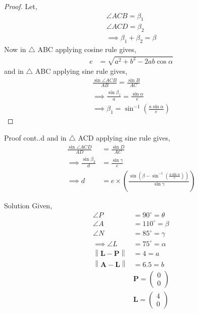 \documentclass{beamer}
\newcommand{\myvec}[1]{\ensuremath{\begin{pmatrix}#1\end{pmatrix}}}
\providecommand{\brak}[1]{\ensuremath{\left(#1\right)}}
\newcommand\norm[1]{\left\lVert#1\right\rVert}
\renewcommand{\vec}[1]{\mathbf{#1}}
\begin{document}
\begin{frame}
\begin{proof}
    Let,
    \begin{align}
        \angle {ACB} = \beta_1\\
        \angle {ACD} = \beta_2\\
        \implies \beta_1 + \beta_2 = \beta \label{a}
    \end{align}
    Now in $\triangle$ ABC applying cosine rule gives,
    \begin{align}
        e &= \sqrt{a^2+b^2-2ab\cos{\alpha}}
    \end{align}
    and in $\triangle$ ABC applying sine rule gives,
    \begin{align}
        \frac{\sin{\angle{ACB}}}{AB} = \frac{\sin B}{AC}\\
        \implies \frac{\sin{\beta_1}}{a} = \frac{\sin{\alpha}}{e}\\
        \implies \beta_1 = \sin^{-1}\brak{\frac{a\sin\alpha}{e}}   \label{b}     
    \end{align}
\end{proof} 
\end{frame}
\begin{frame}
\begin{block}{Proof cont..d}
    and in $\triangle$ ACD applying sine rule gives,
    \begin{align}
        \frac{\sin{\angle{ACD}}}{AD} &= \frac{\sin D}{AC}\\
        \implies \frac{\sin{\beta_2}}{d} &= \frac{\sin{\gamma}}{e}\\
        \implies d &= e\times\brak{\frac{\sin{\brak{\beta-\sin^{-1}\brak{{\frac{a\sin\alpha}{e}}}}}}{\sin\gamma}}
    \end{align}
\end{block}
\end{frame}
\begin{frame}{Solution}
Given, 
\begin{align}
    \angle P &= 90^\circ = \theta\\
    \angle A &= 110^\circ = \beta\\
    \angle N &= 85^\circ = \gamma\\
    \implies \angle L &= 75^\circ = \alpha\\
    \norm{\vec{L}-\vec{P}} &= 4 = a\\
    \norm{\vec{A}-\vec{L}} &= 6.5 = b\\
    &\vec{P} = \myvec{0\\
                     0}\\
    &\vec{L} = \myvec{4\\
                      0}
\end{align}
\end{frame}
\end{document}

